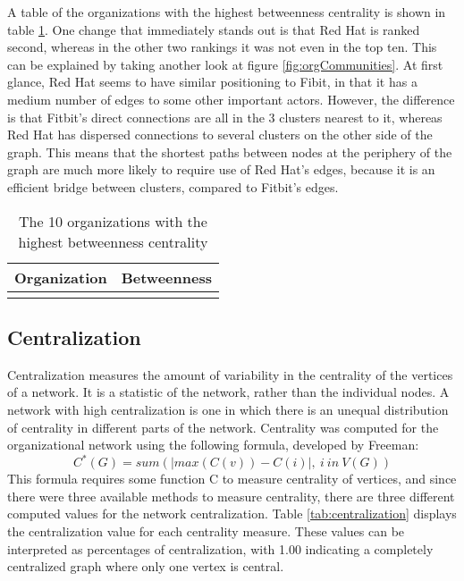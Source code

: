 A table of the organizations with the highest betweenness centrality is shown in table \ref{tab:betweenness}. One change that immediately stands out is that Red Hat is ranked second, whereas in the other two rankings it was not even in the top ten. This can be explained by taking another look at figure \ref{fig:orgCommunities}. At first glance, Red Hat seems to have similar positioning to Fibit, in that it has a medium number of edges to some other important actors. However, the difference is that Fitbit's direct connections are all in the 3 clusters nearest to it, whereas Red Hat has dispersed connections to several clusters on the other side of the graph. This means that the shortest paths between nodes at the periphery of the graph are much more likely to require use of Red Hat's edges, because it is an efficient bridge between clusters, compared to Fitbit's edges.

\begin{table}
	\begin{tabular}{l|c}%
		\bfseries Organization & \bfseries Betweenness%
		\csvreader[head to column names]{betweenness.csv}{}%
		{\\\hline\organizationc & \scorec}%
	\end{tabular}
	\centering
	\caption{The 10 organizations with the highest betweenness centrality}\label{tab:betweenness}
\end{table}

\subsection{Centralization}
Centralization measures the amount of variability in the centrality of the vertices of a network. It is a statistic of the network, rather than the individual nodes. A network with high centralization is one in which there is an unequal distribution of centrality in different parts of the network.  Centrality was computed for the organizational network using the following formula, developed by Freeman\cite{freeman1978centrality}:
\begin{equation*}
C^*(G) = sum( |max(C(v))-C(i)|,\:i\:in\:V(G) )
\end{equation*}
This formula requires some function C to measure centrality of vertices, and since there were three available methods to measure centrality, there are three different computed values for the network centralization. Table \ref{tab:centralization} displays the centralization value for each centrality measure. These values can be interpreted as percentages of centralization, with 1.00 indicating a completely centralized graph where only one vertex is central.

